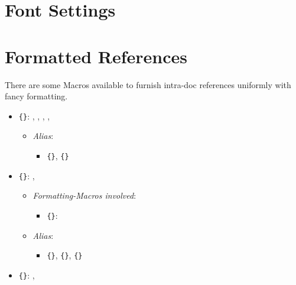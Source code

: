 \section{Font Settings}

%







\section{Formatted References}

There are some Macros available to furnish intra-doc references uniformly with fancy formatting.

\npi
\begin{itemize}
	\item \texttt{\{\}}: , , , , \nl
		\begin{itemize}
			\item \textit{Alias}:
			\begin{itemize}
				\item \texttt{\{\}}, \texttt{\{\}}
			\end{itemize}
		\end{itemize}
	\item \texttt{\{\}}: , 
		\begin{itemize}
			\item \textit{Formatting-Macros involved}:
			\begin{itemize}
				\item \texttt{\{\}}: 
			\end{itemize}
			\item \textit{Alias}:
			\begin{itemize}
				\item \texttt{\{\}}, \texttt{\{\}}, \texttt{\{\}}
			\end{itemize}
		\end{itemize}
	\item \texttt{\{\}}: , 

\end{itemize}
